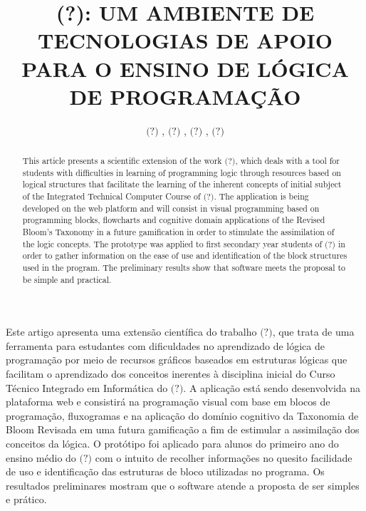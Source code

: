 \documentclass[12pt]{article}
\title{(?): UM AMBIENTE DE TECNOLOGIAS DE APOIO PARA O ENSINO DE LÓGICA DE PROGRAMAÇÃO}
\author{$\textbf{(?)}$ \inst{1}, $\textbf{(?)}$ \inst{1}, $\textbf{(?)}$ \inst{1}, $\textbf{(?)}$ \inst{1}}
\begin{document}
 

\maketitle

\begin{abstract}
This article presents a scientific extension of the work $\textit{(?)}$, which deals with a tool for students with difficulties in learning of programming logic through resources based on logical structures that facilitate the learning of the inherent concepts of initial subject of the Integrated Technical Computer Course of $\textit{(?)}$. The application is being developed on the web platform and will consist in visual programming based on programming blocks, flowcharts and cognitive domain applications of the Revised Bloom's Taxonomy in a future gamification in order to stimulate the assimilation of the logic concepts. The prototype was applied to first secondary year students of $\textit{(?)}$ in order to gather information on the ease of use and identification of the block structures used in the program. The preliminary results show that software meets the proposal to be simple and practical.
\end{abstract}
     
\begin{resumo}
Este artigo apresenta uma extensão científica do trabalho $\textit{(?)}$, que trata de uma ferramenta para estudantes com dificuldades no aprendizado de lógica de programação por meio de recursos gráficos baseados em estruturas lógicas que facilitam o aprendizado dos conceitos inerentes à disciplina inicial do Curso Técnico Integrado em Informática do $\textit{(?)}$. A aplicação está sendo desenvolvida na plataforma web e consistirá na programação visual com base em blocos de programação, fluxogramas e na aplicação do domínio cognitivo da Taxonomia de Bloom Revisada em uma futura gamificação a fim de estimular a assimilação dos conceitos da lógica.  O protótipo foi aplicado para alunos do primeiro ano do ensino médio do $\textit{(?)}$ com o intuito de recolher informações no quesito facilidade de uso e identificação das estruturas de bloco utilizadas no programa. Os resultados preliminares mostram que o software atende a proposta de ser simples e prático.  
\end{resumo}
\end{document}
